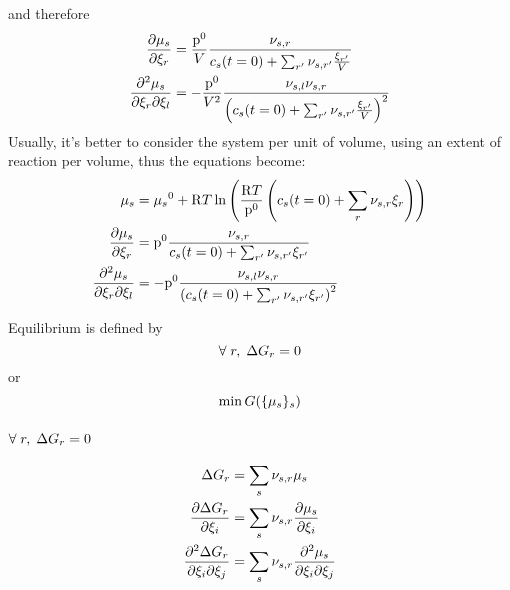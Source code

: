 and therefore
\begin{equation}
\begin{split}
\doverdext[r]{\chempot[s]}      & = \frac{\pz}{\Vol}\frac{\scoef[s,r]}{\molar[s](t=0) + \sum_{r'} \scoef[s,r']\frac{\ext[r']}{\Vol}}\\
\ddoverddext{\chempot[s]}{r}{l} & = -\frac{\pz}{\Vol^2}\frac{\scoef[s,l]\scoef[s,r]}{\left(\molar[s](t=0) + \sum_{r'} \scoef[s,r']\frac{\ext[r']}{\Vol}\right)^2}\\
\end{split}
\end{equation}
Usually, it's better to consider the system per unit of volume, 
using an extent of reaction per volume, thus the equations
become:
\begin{equation}
\begin{split}
\chempot[s]                     & = \chempotZ[s] + \Rg\Temp\ln\left(\frac{\Rg \Temp}{\pz}\left(\molar[s](t=0) + \sum_r \scoef[s,r]\ext[r]\right)\right) \\
\doverdext[r]{\chempot[s]}      & = \pz\frac{\scoef[s,r]}{\molar[s](t=0) + \sum_{r'} \scoef[s,r']\ext[r']}\\
\ddoverddext{\chempot[s]}{r}{l} & = -\pz\frac{\scoef[s,l]\scoef[s,r]}{\left(\molar[s](t=0) + \sum_{r'} \scoef[s,r']\ext[r']\right)^2}\\
\end{split}
\end{equation}

Equilibrium is defined by 
\begin{equation}
\forall\; r,\; \DGibbs_r = 0
\end{equation} 
or 
\begin{equation}
\min \Gibbs(\{\chempot[s]\}_s)
\end{equation}

\subsubsection{\texorpdfstring{$\forall\;r,\;\DGibbs_r = 0$}{Reaction enthalpy}}

\begin{equation}
\begin{split}
\DGibbs_r & = \sum_s \scoef[s,r] \chempot[s]\\
\doverdext[i]{\DGibbs_r}   & = \sum_s\scoef[s,r]\doverdext[i]{\chempot[s]} \\
\ddoverddext{\DGibbs_r}{i}{j} & = \sum_s\scoef[s,r]\ddoverddext{\chempot[s]}{i}{j} \\
\end{split}
\end{equation}

